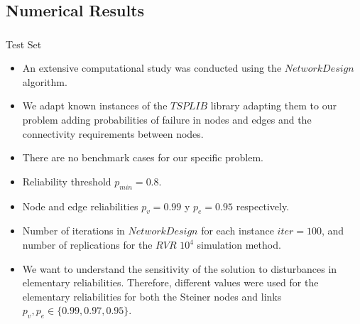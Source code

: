 \subsection{Numerical Results}
\begin{frame}\frametitle{}
\begin{block}{Test Set}
\begin{small}
\begin{itemize}
 \item An extensive computational study was conducted using the $NetworkDesign$ algorithm.
 \item We adapt known instances of the  $TSPLIB$  library adapting them to our problem adding probabilities of failure in nodes and edges and the connectivity requirements between nodes.
 \item There are no benchmark cases for our specific problem.
 \item Reliability threshold $p_{min}=0.8$.
 \item Node and edge reliabilities $p_v=0.99$ y $p_e=0.95$ respectively.
 \item Number of iterations in $NetworkDesign$ for each instance $iter=100$, and number of replications for the $RVR$ $10^4$ simulation method.
 \item We want to understand the sensitivity of the solution to disturbances in elementary reliabilities. Therefore, different values were used for the elementary reliabilities for both the Steiner nodes and links $p_{v},p_{e} \in \{0.99, 0.97,0.95\}$.
\end{itemize} 
\end{small}
\end{block}
\end{frame}

